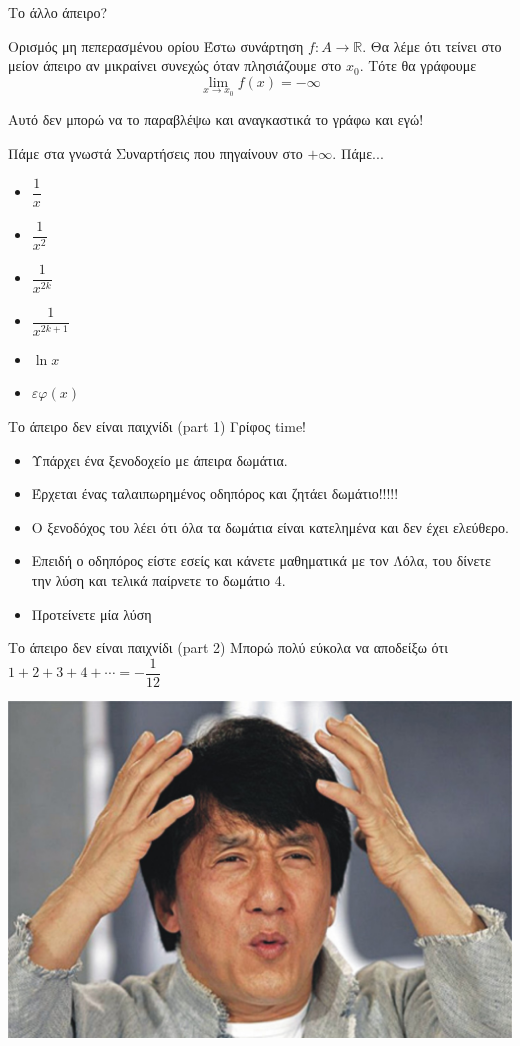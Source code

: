 \documentclass[greek]{beamer}
\begin{document}
\begin{frame}{Το άλλο άπειρο?}
  \begin{block}{Ορισμός μη πεπερασμένου ορίου}
    Έστω συνάρτηση $f:Α\to\mathbb{R}$. Θα λέμε ότι τείνει στο μείον άπειρο αν μικραίνει συνεχώς όταν πλησιάζουμε στο $x_0$. Τότε θα γράφουμε
    $$\lim\limits_{x \to x_0}{ f(x) }=-\infty$$
  \end{block} \pause
  Αυτό δεν μπορώ να το παραβλέψω και αναγκαστικά το γράφω και εγώ!
\end{frame}

\begin{frame}{Πάμε στα γνωστά}
  Συναρτήσεις που πηγαίνουν στο $+\infty$. \pause Πάμε... \pause
  \begin{itemize}
    \item $\dfrac{1}{x}$
    \item $\dfrac{1}{x^2}$
    \item $\dfrac{1}{x^{2k}}$
    \item $\dfrac{1}{x^{2k+1}}$
    \item $\ln{x}$
    \item $εφ(x)$
  \end{itemize}
\end{frame}

\begin{frame}{Το άπειρο δεν είναι παιχνίδι (part 1)}
  Γρίφος time!
  \begin{itemize}
    \item Υπάρχει ένα ξενοδοχείο με άπειρα δωμάτια.
    \item Έρχεται ένας ταλαιπωρημένος οδηπόρος και ζητάει δωμάτιο!!!!!
    \item Ο ξενοδόχος του λέει ότι όλα τα δωμάτια είναι κατελημένα και δεν έχει ελεύθερο.
    \item Επειδή ο οδηπόρος είστε εσείς και κάνετε μαθηματικά με τον Λόλα, του δίνετε την λύση και τελικά παίρνετε το δωμάτιο 4.
    \item Προτείνετε μία λύση
  \end{itemize}
\end{frame}

\begin{frame}{Το άπειρο δεν είναι παιχνίδι (part 2)}
  Μπορώ πολύ εύκολα να αποδείξω ότι $1+2+3+4+\cdots = -\dfrac{1}{12}$

  \centering
  \includegraphics[height=0.4\columnwidth]{images/qiev6}
\end{frame}
\end{document}

